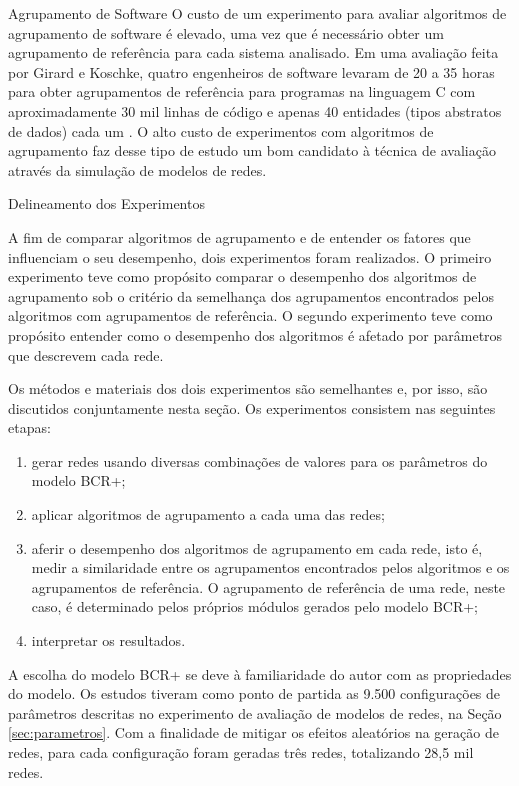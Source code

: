 \begin{section}{Agrupamento de Software}
O custo de um experimento para avaliar algoritmos de agrupamento de software é elevado, uma vez que é necessário obter um agrupamento de referência para cada sistema analisado. Em uma avaliação feita por Girard e Koschke, quatro engenheiros de software levaram de 20 a 35 horas para obter agrupamentos de referência para programas na linguagem C com aproximadamente 30 mil linhas de código e apenas 40 entidades (tipos abstratos de dados) cada um \cite{Girard2000}. O alto custo de experimentos com algoritmos de agrupamento faz desse tipo de estudo um bom candidato à técnica de avaliação através da simulação de modelos de redes.

\end{section}

\begin{section}{Delineamento dos Experimentos}
	
	A fim de comparar algoritmos de agrupamento e de entender os fatores que influenciam o seu desempenho, dois experimentos foram realizados. O primeiro experimento teve como propósito comparar o desempenho dos algoritmos de agrupamento sob o critério da semelhança dos agrupamentos encontrados pelos algoritmos com agrupamentos de referência. O segundo experimento teve como propósito entender como o desempenho dos algoritmos é afetado por parâmetros que descrevem cada rede.
	
	Os métodos e materiais dos dois experimentos são semelhantes e, por isso, são discutidos conjuntamente nesta seção. Os experimentos consistem nas seguintes etapas: 
\begin{enumerate}
	\item gerar redes usando diversas combinações de valores para os parâmetros do modelo BCR+;
	\item aplicar algoritmos de agrupamento a cada uma das redes;
	\item aferir o desempenho dos algoritmos de agrupamento em cada rede, isto é, medir a similaridade entre os agrupamentos encontrados pelos algoritmos e os agrupamentos de referência. O agrupamento de referência de uma rede, neste caso, é determinado pelos próprios módulos gerados pelo modelo BCR+;
	\item interpretar os resultados.
\end{enumerate}

	A escolha do modelo BCR+ se deve à familiaridade do autor com as propriedades do modelo. Os estudos tiveram como ponto de partida as 9.500 configurações de parâmetros descritas no experimento de avaliação de modelos de redes, na Seção \ref{sec:parametros}. Com a finalidade de mitigar os efeitos aleatórios na geração de redes, para cada configuração foram geradas três redes, totalizando 28,5 mil redes.


\end{section}

